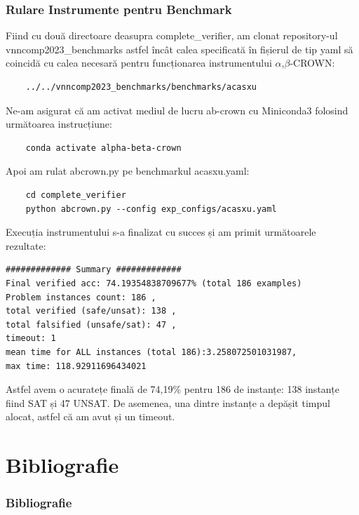 \documentclass{beamer}
\begin{document}
\begin{frame}[containsverbatim]
  \frametitle{Rulare Instrumente pentru Benchmark}
  Fiind cu două directoare deasupra complete\_verifier, am clonat repository-ul vnncomp2023\_benchmarks\cite{vnncomp2023_benchmarks} astfel încât calea specificată în fișierul de tip yaml să coincidă cu calea necesară pentru funcționarea instrumentului \( \alpha \),\( \beta \)-CROWN:
    \begin{verbatim}
    ../../vnncomp2023_benchmarks/benchmarks/acasxu
    \end{verbatim}
    Ne-am asigurat că am activat mediul de lucru ab-crown cu Miniconda3 folosind următoarea instrucțiune: 
    \begin{verbatim}
    conda activate alpha-beta-crown
    \end{verbatim}
    Apoi am rulat abcrown.py pe benchmarkul acasxu.yaml:
    \begin{verbatim}
    cd complete_verifier
    python abcrown.py --config exp_configs/acasxu.yaml
    \end{verbatim}

\end{frame}

\begin{frame}[containsverbatim]
Execuția instrumentului s-a finalizat cu succes și am primit următoarele rezultate:
    \begin{verbatim}
############# Summary #############
Final verified acc: 74.19354838709677% (total 186 examples)
Problem instances count: 186 ,
total verified (safe/unsat): 138 ,
total falsified (unsafe/sat): 47 ,
timeout: 1
mean time for ALL instances (total 186):3.258072501031987,
max time: 118.92911696434021

    \end{verbatim}
    Astfel avem o acuratețe finală de 74,19\% pentru 186 de instanțe: 138 instanțe fiind SAT și 47 UNSAT. De asemenea, una dintre instanțe a depășit timpul alocat, astfel că am avut și un timeout.

\end{frame}

\section{Bibliografie}
\begin{frame}[allowframebreaks]
  \frametitle{Bibliografie}
\begin{enumerate}


\end{enumerate}
\end{frame}
\end{document}
